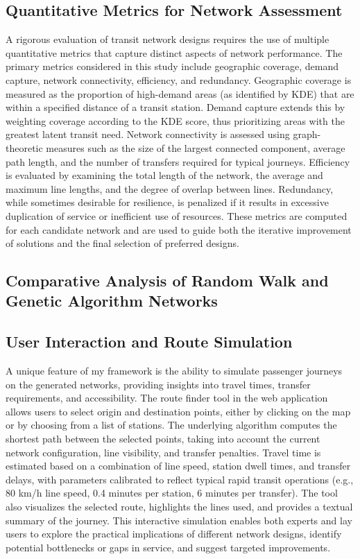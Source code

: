 \documentclass[manuscript]{acmart}
\begin{document}
\subsection{Quantitative Metrics for Network Assessment}
A rigorous evaluation of transit network designs requires the use of multiple quantitative metrics that capture distinct aspects of network performance. The primary metrics considered in this study include geographic coverage, demand capture, network connectivity, efficiency, and redundancy. Geographic coverage is measured as the proportion of high-demand areas (as identified by KDE) that are within a specified distance of a transit station. Demand capture extends this by weighting coverage according to the KDE score, thus prioritizing areas with the greatest latent transit need. Network connectivity is assessed using graph-theoretic measures such as the size of the largest connected component, average path length, and the number of transfers required for typical journeys. Efficiency is evaluated by examining the total length of the network, the average and maximum line lengths, and the degree of overlap between lines. Redundancy, while sometimes desirable for resilience, is penalized if it results in excessive duplication of service or inefficient use of resources. These metrics are computed for each candidate network and are used to guide both the iterative improvement of solutions and the final selection of preferred designs.

\subsection{Comparative Analysis of Random Walk and Genetic Algorithm Networks}

\subsection{User Interaction and Route Simulation}
A unique feature of my framework is the ability to simulate passenger journeys on the generated networks, providing insights into travel times, transfer requirements, and accessibility. The route finder tool in the web application allows users to select origin and destination points, either by clicking on the map or by choosing from a list of stations. The underlying algorithm computes the shortest path between the selected points, taking into account the current network configuration, line visibility, and transfer penalties. Travel time is estimated based on a combination of line speed, station dwell times, and transfer delays, with parameters calibrated to reflect typical rapid transit operations (e.g., 80 km/h line speed, 0.4 minutes per station, 6 minutes per transfer). The tool also visualizes the selected route, highlights the lines used, and provides a textual summary of the journey. This interactive simulation enables both experts and lay users to explore the practical implications of different network designs, identify potential bottlenecks or gaps in service, and suggest targeted improvements.
\end{document}
